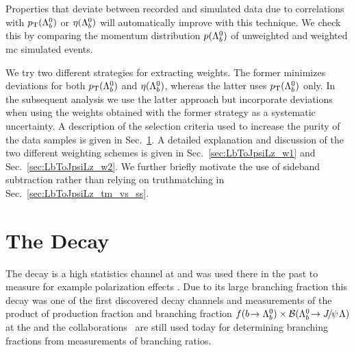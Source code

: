 Properties that deviate between recorded and simulated data due to correlations with $\mbox{$p_{\mathrm{ T}}$}({{\Lambda}^0_{b}})$ or $\eta({{\Lambda}^0_{b}})$ will automatically improve with this technique.
We check this by comparing the momentum distribution $p({{\Lambda}^0_{b}})$ of unweighted and weighted \gls{mc} simulated \decay{\Lb}{\jpsi\Lz} events. 

We try two different strategies for extracting weights.
The former minimizes deviations for both $\mbox{$p_{\mathrm{ T}}$}({{\Lambda}^0_{b}})$ and $\eta({{\Lambda}^0_{b}})$, whereas the latter uses $\mbox{$p_{\mathrm{ T}}$}({{\Lambda}^0_{b}})$ only.
In the subsequent analysis we use the latter approach but incorporate deviations when using the weights obtained with the former strategy as a systematic uncertainty.
A description of the selection criteria used to increase the purity of the \decay{\Lb}{\jpsi\Lz} data samples is given in Sec.~\ref{sec:LbToJpsiLz_sel}.
A detailed explanation and discussion of the two different weighting schemes is given in Sec.~\ref{sec:LbToJpsiLz_w1} and Sec.~\ref{sec:LbToJpsiLz_w2}.
We further briefly motivate the use of sideband subtraction rather than relying on \gls{truthmatching} in Sec.~\ref{sec:LbToJpsiLz_tm_vs_ss}.

\section{The Decay \texorpdfstring{\decay{\Lb}{\jpsi\Lz}}{Λb → J/ψ Λ}}
\label{sec:LbToJpsiLz_sel}
The decay \decay{\Lb}{\jpsi\Lz} is a high statistics channel at \lhcb and was used there in the past to measure for example polarization effects \cite{LbToJpsiLz_polarization}.
Due to its large branching fraction this decay was one of the first discovered \Lb decay channels \cite{LbToJpsiLz_discovery} and measurements of the product of production fraction and branching fraction $f({b}\!\rightarrow {\ensuremath{{\Lambda}^0_{b}}}) \times {\ensuremath{\mathcal{B}}}({{\Lambda}^0_{b}}\!\rightarrow {\ensuremath{{J\mskip -3mu/\mskip -2mu\psi\mskip 2mu}}}{\ensuremath{\Lambda}})$  at the \dzero and the \cdf collaborations~\cite{LbToJpsiLz_D0,LbToJpsiLz_CDF} are still used today for determining branching fractions from measurements of \Lb branching ratios.

